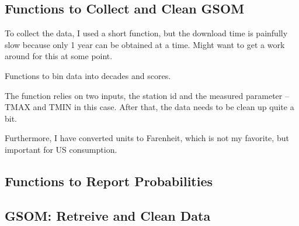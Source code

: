 \documentclass{article}
\begin{document}
\subsection{Functions to Collect and Clean GSOM}

To collect the data, I used a short function, but the download time is painfully slow because only 1 year can be obtained at a time. Might want to get a work around for this at some point. 



Functions to bin data into decades and scores. 



The function relies on two inputs, the station id and the measured parameter -- TMAX and TMIN in this case. After that, the data needs to be clean up quite a bit. 

Furthermore, I have converted units to Farenheit, which is not my favorite, but important for US consumption.

\subsection{Functions to Report Probabilities}




\subsection{GSOM: Retreive and Clean Data}
\end{document}
